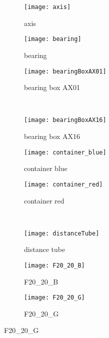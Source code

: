 \documentclass[paper=a4,11pt,parskip=half,toc=listof]{scrartcl}
\begin{document}
\begin{figure}[!htb]
\centering
\begin{subfigure}{.3\textwidth}
  \centering
  \texttt{[image: axis]}
  \caption{axis \cite{github_robocup@work}}
  \label{fig:axis}
\end{subfigure}%
\begin{subfigure}{.3\textwidth}
  \centering
  \texttt{[image: bearing]}
  \caption{bearing \cite{github_robocup@work}}
  \label{fig:bearing}
\end{subfigure}
\begin{subfigure}{.3\textwidth}
  \centering
  \texttt{[image: bearingBoxAX01]}
  \caption{bearing box AX01 \cite{github_robocup@work}}
  \label{fig:bearingBoxAX01}
\end{subfigure}\\
\vspace{3mm}
\begin{subfigure}{.3\textwidth}
  \centering
  \texttt{[image: bearingBoxAX16]}
  \caption{bearing box AX16}
  \label{fig:bearingBoxAX16}
\end{subfigure}
\begin{subfigure}{.3\textwidth}
  \centering
  \texttt{[image: container\_blue]}
  \caption{container blue \cite{github_robocup@work}}
  \label{fig:container_blue}
\end{subfigure}
\begin{subfigure}{.3\textwidth}
  \centering
  \texttt{[image: container\_red]}
  \caption{container red \cite{github_robocup@work}}
  \label{fig:container_red}
\end{subfigure}\\
\vspace{3mm}
\begin{subfigure}{.3\textwidth}
  \centering
  \texttt{[image: distanceTube]}
  \caption{distance tube \cite{github_robocup@work}}
  \label{fig:distanceTube}
\end{subfigure}
\begin{subfigure}{.3\textwidth}
  \centering
  \texttt{[image: F20\_20\_B]}
  \caption{F20\_20\_B \cite{github_robocup@work}}
  \label{fig:F20_20_B}
\end{subfigure}
\begin{subfigure}{.3\textwidth}
  \centering
  \texttt{[image: F20\_20\_G]}
  \caption{F20\_20\_G \cite{github_robocup@work}}
  \label{fig:F20_20_G}

\end{subfigure}
\end{figure}
\end{document}
